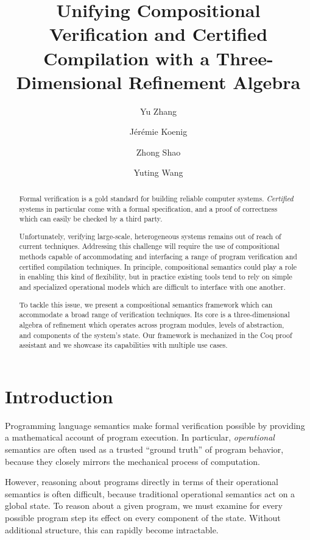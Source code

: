 \documentclass[acmsmall,screen,review,nonacm]{acmart}
\title{Unifying Compositional Verification and Certified Compilation
  with a Three-Dimensional Refinement Algebra}
\author{Yu Zhang}
\affiliation{
  \institution{Yale University}
  \city{New Haven}
  \state{CT}
  \country{USA}}
\author{J\'er\'emie Koenig}
\affiliation{
  \institution{Yale University}
  \city{New Haven}
  \state{CT}
  \country{USA}}
\author{Zhong Shao}
\affiliation{
  \institution{Yale University}
  \city{New Haven}
  \state{CT}
  \country{USA}}
\author{Yuting Wang}
\affiliation{
  \institution{Shanghai Jiao Tong University}
  \city{Shanghai}
  \country{China}}
\begin{document}
\newtheorem{remark}[theorem]{Remark}

\begin{abstract} %
Formal verification is a gold standard
for building reliable computer systems.
\emph{Certified} systems in particular
come with a formal specification,
and a proof of correctness
which can easily be checked by a third party.

Unfortunately, verifying large-scale, heterogeneous systems
remains out of reach of current techniques.
Addressing this challenge
will require the use of compositional methods
capable of accommodating and interfacing
a range of program verification and certified compilation techniques.
In principle,
compositional semantics
could play a role in enabling this kind of flexibility, but
in practice
existing tools
tend to rely on
simple and specialized
operational models
which are difficult to interface with one another.

To tackle this issue,
we present a compositional semantics framework
which can accommodate a broad range of verification techniques.
Its core is a three-dimensional algebra of refinement
which operates across program modules,
levels of abstraction, and
components of the system's state.
Our framework is mechanized in the Coq proof assistant
and we showcase its capabilities with multiple use cases.
\end{abstract}


\maketitle

\section{Introduction} \label{ref:intro} %


Programming language semantics
make formal verification possible
by providing a mathematical account of program execution.
In particular,
\emph{operational} semantics
are often used as a trusted ``ground truth''
of program behavior,
because they closely mirrors
the mechanical process of computation.

However,
reasoning about programs
directly in terms of their operational semantics
is often difficult, because
traditional operational semantics act on a global state.
To reason about a given program,
we must examine for every possible program step
its effect on every component of the state.
Without additional structure,
this can rapidly become intractable.
\end{document}
